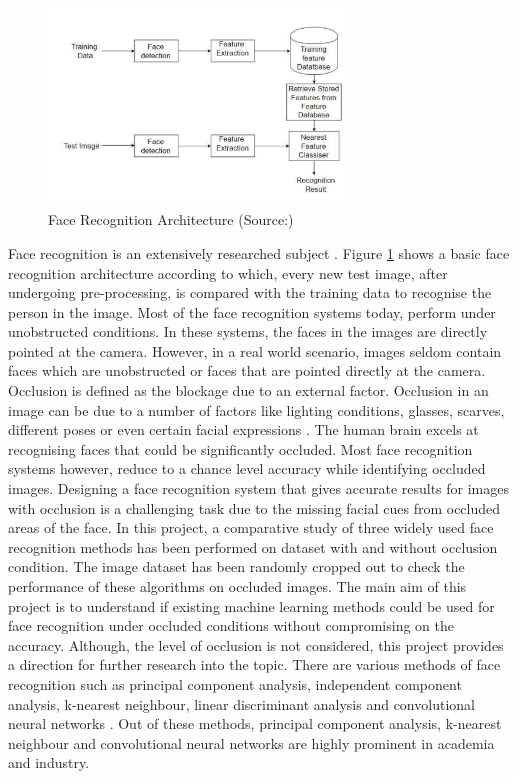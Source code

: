 \documentclass[conference]{IEEEtran}
\begin{document}
\begin{figure}[h!]

 \centering
 \includegraphics[width = 8cm]{face_recognition_architecture.pdf}
 \caption{ Face Recognition Architecture (Source:\cite{makwana_makwana_2016})}
 \label{fig 1: face recognition architecture}
\end{figure}

Face recognition is an extensively researched subject\cite{zhao2003face} \cite{abate20072d}. Figure \ref{fig 1: face recognition architecture} shows a basic face recognition architecture according to which, every new test image, after undergoing pre-processing, is compared with the training data to recognise the person in the image. Most of the face recognition systems today, perform under unobstructed conditions\cite{phillips2005overview}. In these systems, the faces in the images are directly pointed at the camera. However, in a real world scenario, images seldom contain faces which are unobstructed or  faces that are pointed directly at the camera. Occlusion is defined as the blockage due to an external factor. Occlusion in an image can be due to a number of factors like lighting conditions, glasses, scarves, different poses or even certain facial expressions \cite{wright2009robust}. The human brain excels at recognising faces that could be significantly occluded. Most face recognition systems however, reduce to a chance level accuracy while identifying occluded images. Designing a face recognition system that gives accurate results for images with occlusion is a challenging task due to the missing facial cues from occluded areas of the face. In this project, a comparative study of three widely used face recognition methods has been performed on dataset with and without occlusion condition. The image dataset has been randomly cropped out to check the performance of these algorithms on occluded images. The main aim of this project is to understand if existing machine learning methods could be used for face recognition under occluded conditions without compromising on the accuracy. Although, the level of occlusion is not considered,  this project provides a direction for further research into the topic. There are various methods of face recognition such as principal component analysis, independent component analysis, k-nearest neighbour, linear discriminant analysis and convolutional neural networks \cite{zhao2003face}. Out of these methods, principal component analysis, k-nearest neighbour and convolutional neural networks are highly prominent in academia and industry.
\end{document}
